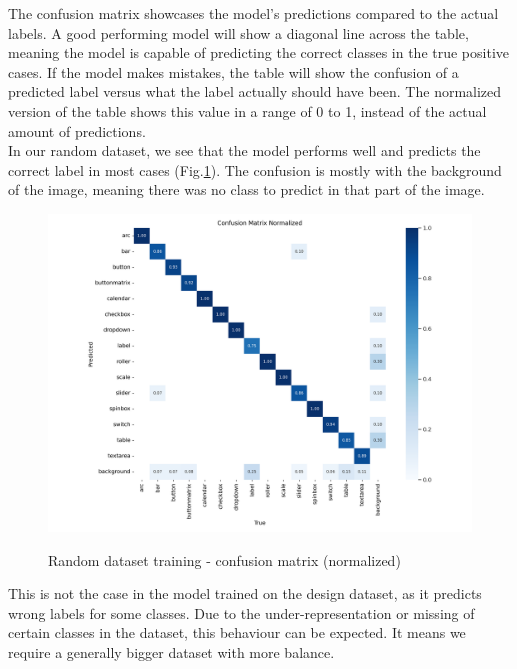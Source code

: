 \documentclass[Bachelor, BIC, english, fhCitStyle, IEEE]{BASE/twbook} %
\begin{document}
\noindent
The confusion matrix showcases the model's predictions compared to the actual labels. A good performing model will show a diagonal line across the table, meaning the model is capable of predicting the correct classes in the true positive cases. If the model makes mistakes, the table will show the confusion of a predicted label versus what the label actually should have been. The normalized version of the table shows this value in a range of 0 to 1, instead of the actual amount of predictions.\\
In our random dataset, we see that the model performs well and predicts the correct label in most cases (Fig.\ref{fig:random-training-confusion}). The confusion is mostly with the background of the image, meaning there was no class to predict in that part of the image.
\begin{figure}[H]
    \caption{Random dataset training - confusion matrix (normalized)}
    \centering
    \includegraphics[width=\textwidth]{PICs/train371/confusion_matrix_normalized.png}
    \label{fig:random-training-confusion}
\end{figure}
\noindent
This is not the case in the model trained on the design dataset, as it predicts wrong labels for some classes. Due to the under-representation or missing of certain classes in the dataset, this behaviour can be expected. It means we require a generally bigger dataset with more balance.
\end{document}
